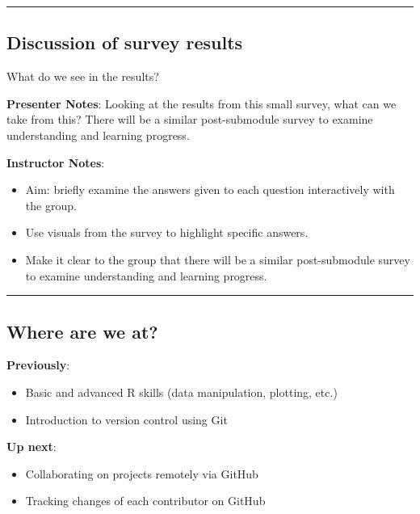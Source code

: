 \documentclass[
  letterpaper,
  DIV=11,
  numbers=noendperiod]{scrartcl}
\providecommand{\tightlist}{%
  \setlength{\itemsep}{0pt}\setlength{\parskip}{0pt}}
\begin{document}
\begin{center}\rule{0.5\linewidth}{0.5pt}\end{center}

\subsection{Discussion of survey
results}\label{discussion-of-survey-results}

What do we see in the results?

\textbf{Presenter Notes}: Looking at the results from this small survey,
what can we take from this? There will be a similar post-submodule
survey to examine understanding and learning progress.

\textbf{Instructor Notes}:

\begin{itemize}
\item
  Aim: briefly examine the answers given to each question interactively
  with the group.
\item
  Use visuals from the survey to highlight specific answers.
\item
  Make it clear to the group that there will be a similar post-submodule
  survey to examine understanding and learning progress.
\end{itemize}

\begin{center}\rule{0.5\linewidth}{0.5pt}\end{center}

\subsection{Where are we at?}\label{where-are-we-at}

\textbf{Previously}:

\begin{itemize}
\tightlist
\item
  Basic and advanced R skills (data manipulation, plotting, etc.)
\item
  Introduction to version control using Git
\end{itemize}

\textbf{Up next}:

\begin{itemize}
\tightlist
\item
  Collaborating on projects remotely via GitHub
\item
  Tracking changes of each contributor on GitHub
\end{itemize}
\end{document}
